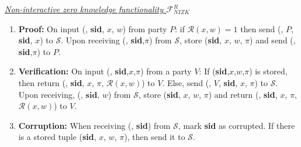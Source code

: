 \begin{tcolorbox}[colback=white, arc=5pt]
    \noindent\emph{\underline{Non-interactive zero knowledge functionality $\mathcal{F}_{NIZK}^{R}$}}\\[5pt]
    \begin{enumerate}
        \item \textbf{Proof:} On input (, \textbf{sid}, $x$, $w$) from party $P$: if $\mathcal{R}(x,w)=1$ then send (, $P$, \textbf{sid}, $x$) to $\mathcal{S}$. Upon receiving (, \textbf{sid},$\pi$) from $\mathcal{S}$, store (\textbf{sid}, $x$, $w$, $\pi$) and send (, \textbf{sid},$\pi$) to $P$.
        \item \textbf{Verification:} On input (, \textbf{sid},$x$,$\pi$) from a party $V$: If (\textbf{sid},$x$,$w$,$\pi$) is stored, then return (, \textbf{sid}, $x$, $\pi$, $\mathcal{R}(x,w)$) to $V$. Else, send (, $V$, \textbf{sid}, $x$, $\pi$) to $\mathcal{S}$. Upon receiving, (, $\textbf{sid}$, $w$) from $\mathcal{S}$, store (\textbf{sid}, $x$, $w$, $\pi$) and return (, \textbf{sid}, $x$, $\pi$, $\mathcal{R}(x,w)$) to $V$.
        \item \textbf{Corruption:} When receiving (, \textbf{sid}) from $\mathcal{S}$, mark \textbf{sid} as corrupted. If there is a stored tuple (\textbf{sid}, $x$, $w$, $\pi$), then send it to $\mathcal{S}$.
    \end{enumerate}
\end{tcolorbox}
\label{fig:zk_functionality}